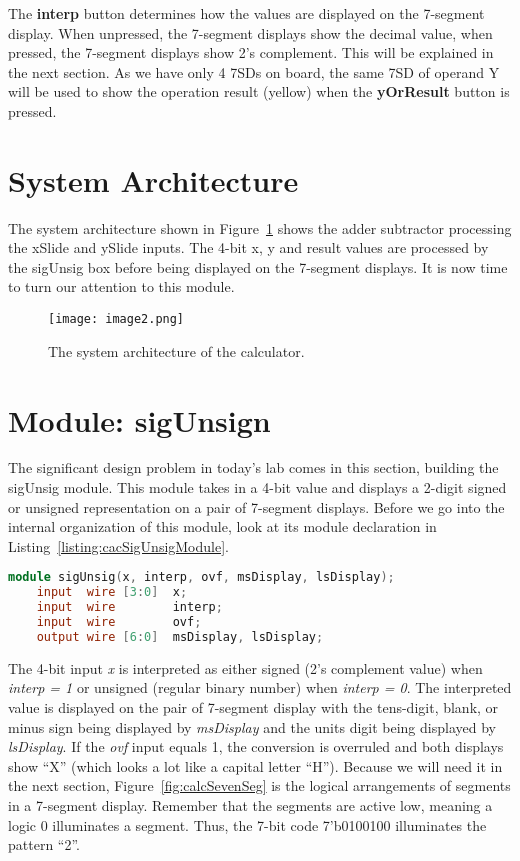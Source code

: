The \textbf{interp} button determines how the values are displayed on the
7-segment display. When unpressed, the 7-segment displays show the
decimal value, when pressed, the 7-segment displays show 2's complement.
This will be explained in the next section. As we have only 4 7SDs on
board, the same 7SD of operand Y will be used to show the operation
result (yellow) when the \textbf{yOrResult} button is pressed.

\section{System Architecture}

The system architecture shown in Figure~\ref{fig:sysArchCalc} shows the adder subtractor
processing the xSlide and ySlide inputs. The 4-bit x, y and result
values are processed by the sigUnsig box before being displayed on the
7-segment displays. It is now time to turn our attention to this module.

\begin{figure}[ht]
\texttt{[image:  image2.png]}
\caption{The system architecture of the calculator.}
\label{fig:sysArchCalc}
\end{figure}


\section{Module: sigUnsign}

The significant design problem in today's lab comes in this section,
building the sigUnsig module. This module takes in a 4-bit value and
displays a 2-digit signed or unsigned representation on a pair of
7-segment displays. Before we go into the internal organization of this
module, look at its module declaration in Listing~\ref{listing:cacSigUnsigModule}.


\begin{lstlisting}[language=Verilog,
 caption={Module declaration for the sigUnsig module.},
 label={listing:cacSigUnsigModule},
 frame=single]
 module sigUnsig(x, interp, ovf, msDisplay, lsDisplay);    
    input  wire [3:0]  x;	 	 
    input  wire        interp;
    input  wire        ovf;
    output wire [6:0]  msDisplay, lsDisplay;
 \end{lstlisting}




The 4-bit input \emph{x} is interpreted as either signed (2's complement
value) when \emph{interp = 1} or unsigned (regular binary number) when
\emph{interp = 0}. The interpreted value is displayed on the pair of
7-segment display with the tens-digit, blank, or minus sign being
displayed by \emph{msDisplay} and the units digit being displayed by
\emph{lsDisplay}. If the \emph{ovf} input equals 1, the conversion is
overruled and both displays show ``X'' (which looks a lot like a capital
letter ``H''). Because we will need it in the next section, Figure~\ref{fig:calcSevenSeg} is
the logical arrangements of segments in a 7-segment display. Remember
that the segments are active low, meaning a logic 0 illuminates a
segment. Thus, the 7-bit code 7'b0100100 illuminates the pattern ``2''.

